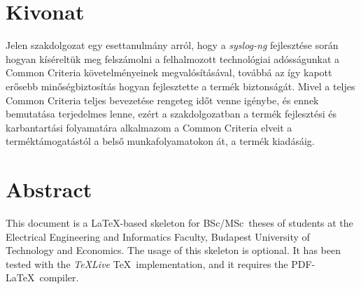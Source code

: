\chapter*{Kivonat}

Jelen szakdolgozat egy esettanulmány arról, hogy a \emph{syslog-ng} fejlesztése során hogyan
kíséreltük meg felszámolni a felhalmozott technológiai adósságunkat a Common Criteria
követelményeinek megvalósításával, továbbá az így kapott erősebb minőségbiztosítás hogyan
fejlesztette a termék biztonságát. Mivel a teljes Common Criteria teljes bevezetése rengeteg időt
venne igénybe, és ennek bemutatása terjedelmes lenne, ezért a szakdolgozatban a termék fejlesztési
és karbantartási folyamatára alkalmazom a Common Criteria elveit a terméktámogatástól a belső
munkafolyamatokon át, a termék kiadásáig.


\vfill

\chapter*{Abstract}

This document is a \LaTeX-based skeleton for BSc/MSc~theses of students at the Electrical
Engineering and Informatics Faculty, Budapest University of Technology and Economics. The usage of
this skeleton is optional. It has been tested with the \emph{TeXLive} \TeX~implementation, and it
requires the PDF-\LaTeX~compiler.
\vfill

